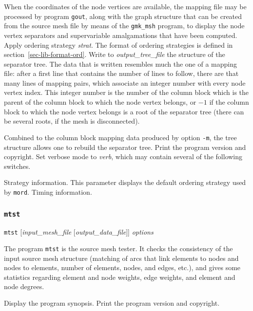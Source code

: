 \begin{itemize}
\begin{itemize}
When the coordinates of the node vertices are available, the mapping
file may be processed by program \texttt{gout}, along with the graph
structure that can be created from the source mesh file by means of
the \texttt{gmk\_\lbt msh} program, to display the node vertex separators
and supervariable amalgamations that have been computed.
Apply ordering strategy {\it strat}. The format of ordering
strategies is defined in section~\ref{sec-lib-format-ord}.
Write to {\it output\_tree\_file\/} the structure of the separator
tree. The data that is written resembles much the one of a mapping
file: after a first line that contains the number of lines to follow,
there are that many lines of mapping pairs, which associate an integer
number with every node vertex index. This integer number is the
number of the column block which is the parent of the column block to
which the node vertex belongs, or $-1$ if the column block to which the
node vertex belongs is a root of the separator tree (there can be
several roots, if the mesh is disconnected).

Combined to the column block mapping data produced by option \texttt{-m},
the tree structure allows one to rebuild the separator tree.
\iteme[\texttt{-V}]
Print the program version and copyright.
Set verbose mode to {\it verb}, which may contain several of the following
switches.
\begin{itemize}
\iteme[\texttt{s}]
Strategy information. This parameter displays the default ordering
strategy used by \texttt{mord}.
\iteme[\texttt{t}]
Timing information.
\end{itemize}
\end{itemize}
\end{itemize}

\subsubsection{\texttt{mtst}}

\begin{itemize}
\progsyn
\texttt{mtst} [{\it input\_mesh\_file} [{\it output\_data\_file}]] {\it options}

\progdes
The program \texttt{mtst} is the source mesh tester. It checks the
consistency of the input source mesh structure (matching of arcs
that link elements to nodes and nodes to elements, number of elements,
nodes, and edges, etc\@.), and gives some statistics regarding element
and node weights, edge weights, and element and node degrees.

\progopt
\begin{itemize}
\iteme[\texttt{-h}]
Display the program synopsis.
\iteme[\texttt{-V}]
Print the program version and copyright.
\end{itemize}
\end{itemize}
